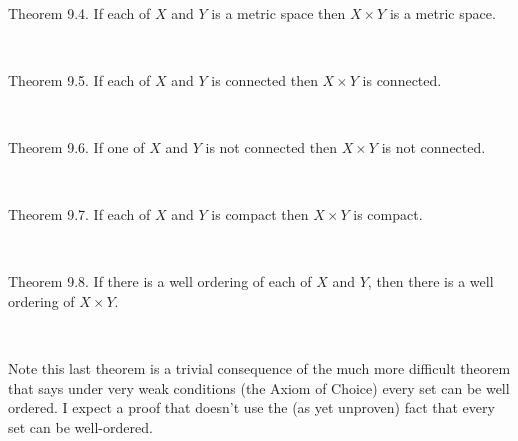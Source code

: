 \documentclass[12pt, std]{article}
\begin{document}
\

Theorem 9.4.  If each of $X$ and $Y$ is a metric space then $X
\times Y$ is a metric space.

\

Theorem 9.5.  If each of $X$ and $Y$ is connected then $X \times Y$
is connected.

\

Theorem 9.6.  If one of $X$ and $Y$ is not connected then $X \times
Y$ is not connected.

\

Theorem 9.7.  If each of $X$ and $Y$ is compact then $X \times Y$
is compact.

\

Theorem 9.8.  If there is a well ordering of each of $X$ and $Y$, then there is a well ordering of $X \times
Y$.

\

Note this last theorem is a trivial consequence of the much more
difficult theorem that says under very weak conditions (the Axiom of
Choice) every set can be well ordered.  I expect a proof that doesn't use the (as yet unproven) fact that every set can be well-ordered.  
\end{document}
